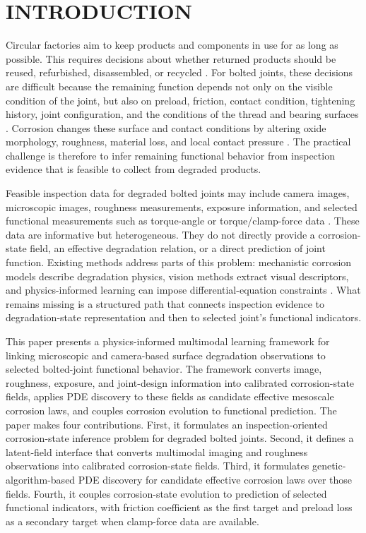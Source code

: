 \documentclass[colorlinks,upint,subscriptcorrection,varvw,hyphenate,balance]{asmeconf}
\begin{document}
\section{INTRODUCTION}
Circular factories aim to keep products and components in use for as long as possible. This requires decisions about whether returned products  should
be reused, refurbished, disassembled, or recycled
\cite{potting2017circular,reike2018rs}. For bolted joints, these decisions are
difficult because the remaining function depends not only on the visible
condition of the joint, but also on preload, friction, contact condition,
tightening history, joint configuration, and the conditions of the thread and
bearing surfaces \cite{bickford2007bolted,buda2003bolted,vdi2230part3}.
Corrosion changes these surface and contact conditions by altering oxide
morphology, roughness, material loss, and local contact pressure
\cite{king2023review,albert2024chemical,jiang2022preload,afifi2025probabilistic}. The practical challenge is therefore to infer remaining functional behavior from inspection evidence that is feasible to collect from degraded products.\cite{afifi2024data}

Feasible inspection data for degraded bolted joints may include camera images,
microscopic images, roughness measurements, exposure information, and selected
functional measurements such as torque-angle or torque/clamp-force data
\cite{iso16047}. These data are informative but heterogeneous. They do not
directly provide a corrosion-state field, an effective degradation relation, or
a direct prediction of joint function. Existing methods address parts of this
problem: mechanistic corrosion models describe degradation physics, vision
methods extract visual descriptors, and physics-informed learning can impose
differential-equation constraints
\cite{martinezpaneda2024review,wu2025fusion,raissi2019pinn,rudy2017pdefind}.
What remains missing is a structured path that connects inspection evidence to
degradation-state representation and then to selected joint's functional indicators.

This paper presents a physics-informed multimodal learning framework for
linking microscopic and camera-based surface degradation observations to
selected bolted-joint functional behavior. The framework converts image,
roughness, exposure, and joint-design information into calibrated
corrosion-state fields, applies PDE discovery to these fields as candidate
effective mesoscale corrosion laws, and couples corrosion evolution to
functional prediction. The paper makes four contributions. First, it
formulates an inspection-oriented corrosion-state inference problem for
degraded bolted joints. Second, it defines a latent-field interface that
converts multimodal imaging and roughness observations into calibrated
corrosion-state fields. Third, it formulates genetic-algorithm-based PDE
discovery for candidate effective corrosion laws over those fields. Fourth, it
couples corrosion-state evolution to prediction of selected functional
indicators, with friction coefficient as the first target and preload loss as
a secondary target when clamp-force data are available.
\end{document}
